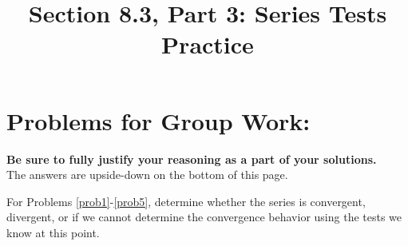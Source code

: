 \documentclass[10pt]{article}
\begin{document}
\newcommand{\an}{\lbrace a_n \rbrace}
\newcommand{\Sum}{\sum_{n=1}^\infty }

\everymath{\displaystyle}

\renewcommand{\myTitle}{MATH 1336: Calculus III}

\renewcommand{\mySubTitle}{Section 8.3, Part 3: Series Tests Practice}

\title{\mySubTitle}\date{}
\maketitle

\section*{Problems for Group Work:}
\textbf{Be sure to fully justify your reasoning as a part of your solutions.}\\
 The answers are upside-down on the bottom of this page.

For Problems \ref{prob1}-\ref{prob5}, determine whether the series is convergent, divergent, or if we cannot determine the convergence behavior using the tests we know at this point.
\end{document}
